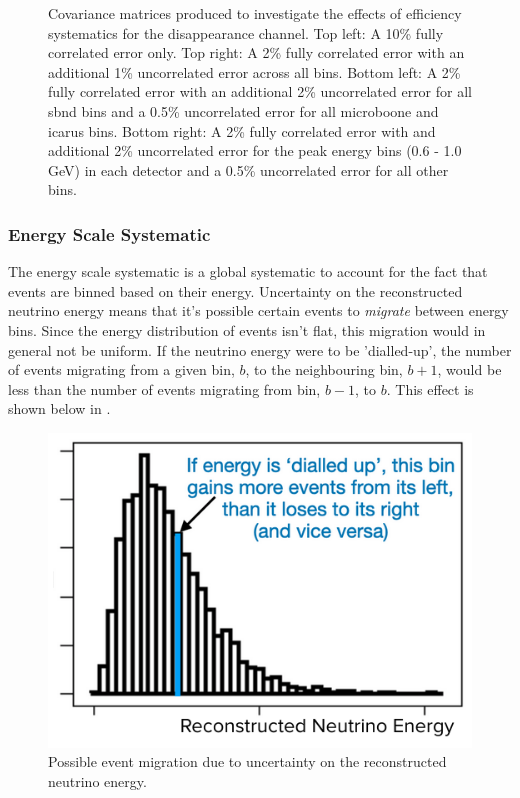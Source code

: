 \begin{figure}[h!]
    \caption[Example efficiency uncertainty covariance matrices.]{Covariance matrices produced to investigate the effects of efficiency systematics for the \numu disappearance channel. Top left: A 10\% fully correlated error only. Top right: A 2\% fully correlated error with an additional 1\% uncorrelated error across all bins. Bottom left: A 2\% fully correlated error with an additional 2\% uncorrelated error for all \gls{sbnd} bins and a 0.5\% uncorrelated error for all \gls{microboone} and \gls{icarus} bins. Bottom right: A 2\% fully correlated error with and additional 2\% uncorrelated error for the peak energy bins (0.6 - 1.0 GeV) in each detector and a 0.5\% uncorrelated error for all other bins.}
    \label{fig:efficiency_cov_matrices}
\end{figure}




\newpage
\subsubsection*{Energy Scale Systematic}

The energy scale systematic is a global systematic to account for the fact that events are binned based on their energy. Uncertainty on the reconstructed neutrino energy means that it's possible certain events to \textit{migrate} between energy bins. Since the energy distribution of events isn't flat, this migration would in general not be uniform. If the neutrino energy were to be 'dialled-up', the number of events migrating from a given bin, $b$, to the neighbouring bin, $b + 1$, would be less than the number of events migrating from bin, $b - 1$, to $b$. This effect is shown below in . 

\begin{figure}[!h]
    \centering
    \includegraphics[width = \largefigwidth]{figures-chap5/energy_scale.png}
    \caption{Possible event migration due to uncertainty on the reconstructed neutrino energy.}
    \label{fig:energy_scale}
\end{figure}

